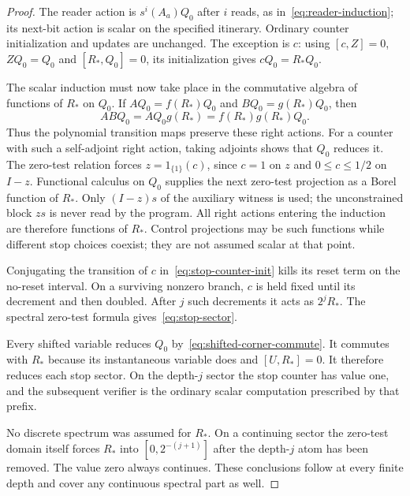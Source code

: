 \begin{proof}
The reader action is $s^i(A_a)Q_0$ after $i$ reads, as in~\eqref{eq:reader-induction}; its next-bit action is scalar on the specified itinerary. Ordinary counter initialization and updates are unchanged. The exception is $c$: using $[c,Z]=0$, $ZQ_0=Q_0$ and $[R_*,Q_0]=0$, its initialization gives $cQ_0=R_*Q_0$.

The scalar induction must now take place in the commutative algebra of functions of $R_*$ on $Q_0$. If $AQ_0=f(R_*)Q_0$ and $BQ_0=g(R_*)Q_0$, then
\begin{equation}\label{eq:stop-functional-product}
 ABQ_0=AQ_0g(R_*)=f(R_*)g(R_*)Q_0.
\end{equation}
Thus the polynomial transition maps preserve these right actions. For a counter with such a self-adjoint right action, taking adjoints shows that $Q_0$ reduces it. The zero-test relation forces $z=1_{\{1\}}(c)$, since $c=1$ on $z$ and $0\le c\le1/2$ on $I-z$. Functional calculus on $Q_0$ supplies the next zero-test projection as a Borel function of $R_*$. Only $(I-z)s$ of the auxiliary witness is used; the unconstrained block $zs$ is never read by the program. All right actions entering the induction are therefore functions of $R_*$. Control projections may be such functions while different stop choices coexist; they are not assumed scalar at that point.

Conjugating the transition of $c$ in~\eqref{eq:stop-counter-init} kills its reset term on the no-reset interval. On a surviving nonzero branch, $c$ is held fixed until its decrement and then doubled. After $j$ such decrements it acts as $2^jR_*$. The spectral zero-test formula gives~\eqref{eq:stop-sector}.

Every shifted variable reduces $Q_0$ by~\eqref{eq:shifted-corner-commute}. It commutes with $R_*$ because its instantaneous variable does and $[U,R_*]=0$. It therefore reduces each stop sector. On the depth-$j$ sector the stop counter has value one, and the subsequent verifier is the ordinary scalar computation prescribed by that prefix.

No discrete spectrum was assumed for $R_*$. On a continuing sector the zero-test domain itself forces $R_*$ into $[0,2^{-(j+1)}]$ after the depth-$j$ atom has been removed. The value zero always continues. These conclusions follow at every finite depth and cover any continuous spectral part as well.
\end{proof}


